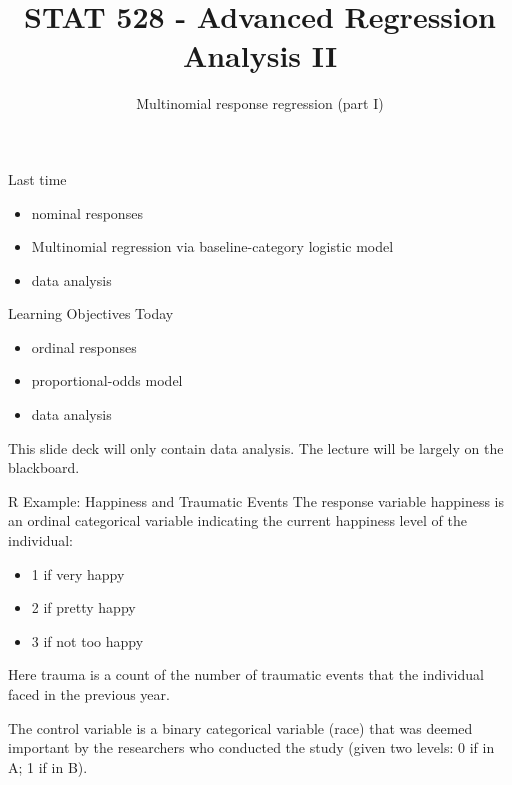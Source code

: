 \documentclass[
  ignorenonframetext,
]{beamer}
\title{STAT 528 - Advanced Regression Analysis II}
\author{Multinomial response regression (part I)}
\date{}
\institute{Daniel J. Eck\\
Department of Statistics\\
University of Illinois}
\providecommand{\tightlist}{%
  \setlength{\itemsep}{0pt}\setlength{\parskip}{0pt}}
\begin{document}
\frame{\titlepage}

\begin{frame}
\newcommand{\R}{\mathbb{R}}
\newcommand{\Prob}{\mathbb{P}}
\newcommand{\Proj}{\textbf{P}}
\newcommand{\Hcal}{\mathcal{H}}
\newcommand{\rootn}{\sqrt{n}}
\newcommand{\p}{\mathbf{p}}
\newcommand{\E}{\text{E}}
\newcommand{\Var}{\text{Var}}
\newcommand{\Cov}{\text{Cov}}
\newcommand{\mubf}{\bm{\mu}}
\newcommand{\logit}{\text{logit}}

\newtheorem{cor}{Corollary}
\newtheorem{lem}{Lemma}
\newtheorem{thm}{Theorem}
\newtheorem{defn}{Definition}
\newtheorem{prop}{Proposition}
\end{frame}

\begin{frame}{Last time}
\protect\hypertarget{last-time}{}
\begin{itemize}
\tightlist
\item
  nominal responses
\item
  Multinomial regression via baseline-category logistic model
\item
  data analysis
\end{itemize}
\end{frame}

\begin{frame}{Learning Objectives Today}
\protect\hypertarget{learning-objectives-today}{}
\begin{itemize}
\tightlist
\item
  ordinal responses
\item
  proportional-odds model
\item
  data analysis
\end{itemize}

\vspace{12pt}

This slide deck will only contain data analysis. The lecture will be
largely on the blackboard.
\end{frame}

\begin{frame}{R Example: Happiness and Traumatic Events}
\protect\hypertarget{r-example-happiness-and-traumatic-events}{}
The response variable happiness is an ordinal categorical variable
indicating the current happiness level of the individual:

\begin{itemize}
\tightlist
\item
  1 if very happy
\item
  2 if pretty happy
\item
  3 if not too happy
\end{itemize}

\vspace{12pt}

Here trauma is a count of the number of traumatic events that the
individual faced in the previous year.

\vspace{12pt}

The control variable is a binary categorical variable (race) that was
deemed important by the researchers who conducted the study (given two
levels: 0 if in A; 1 if in B).
\end{frame}
\end{document}
